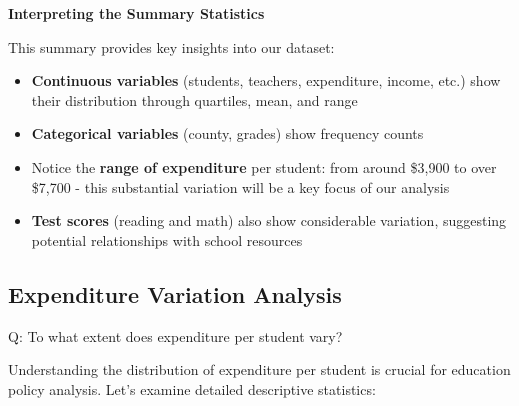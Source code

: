 \documentclass[
  12pt,
  letterpaper,
]{scrbook}
\providecommand{\tightlist}{%
  \setlength{\itemsep}{0pt}\setlength{\parskip}{0pt}}
\renewcommand{\tightlist}{\setlength{\itemsep}{0.5\baselineskip}\setlength{\parskip}{0.2\baselineskip}}
\theoremstyle{plain}
\theoremstyle{definition}
\theoremstyle{remark}
\begin{document}
\textbf{Interpreting the Summary Statistics}

This summary provides key insights into our dataset:

\begin{itemize}
\tightlist
\item
  \textbf{Continuous variables} (students, teachers, expenditure,
  income, etc.) show their distribution through quartiles, mean, and
  range
\item
  \textbf{Categorical variables} (county, grades) show frequency counts
\item
  Notice the \textbf{range of expenditure} per student: from around
  {\$3,900} to over {\$7,700} - this substantial variation will be a key
  focus of our analysis
\item
  \textbf{Test scores} (reading and math) also show considerable
  variation, suggesting potential relationships with school resources
\end{itemize}

\subsection{Expenditure Variation
Analysis}\label{expenditure-variation-analysis}

Q: To what extent does expenditure per student vary?

Understanding the distribution of expenditure per student is crucial for
education policy analysis. Let's examine detailed descriptive
statistics:
\end{document}
